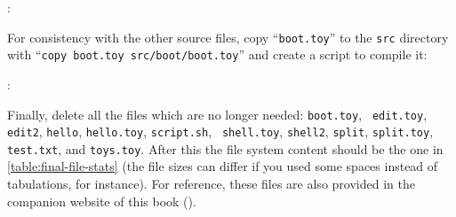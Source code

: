 :

For consistency with the other source files, copy ``{\tt boot.toy}'' to the
{\tt src} directory with ``{\tt copy boot.toy src/boot/boot.toy}'' and create a
script to compile it:

\medskip {}:


Finally, delete all the files which are no longer needed: {\tt boot.toy}, {\tt
edit.toy}, {\tt edit2}, {\tt hello}, {\tt hello.toy}, {\tt script.sh}, {\tt
shell.toy}, {\tt shell2}, {\tt split}, {\tt split.toy}, {\tt test.txt}, and
{\tt toys.toy}. After this the file system content should be the one in
\cref{table:final-file-stats} (the file sizes can differ if you used some
spaces instead of tabulations, for instance). For reference, these files are
also provided in the companion website of this book (\toypcurl{}).

